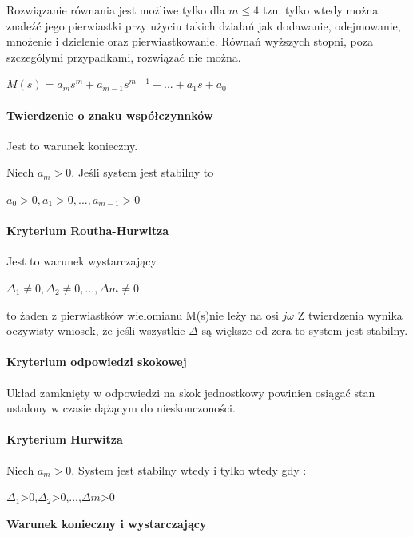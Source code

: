 \documentclass[a4paper,twoside]{report}
\begin{document}
Rozwiązanie równania jest możliwe tylko dla $m\le 4 $ tzn. tylko wtedy można znaleźć jego pierwiastki przy użyciu takich działań jak dodawanie, odejmowanie, mnożenie i dzielenie oraz pierwiastkowanie. Równań wyższych stopni, poza szczególymi przypadkami, rozwiązać nie można.
\begin{center}
$M(s)=a_{m}s^{m}+a_{m-1}s^{m-1}+...+a_{1}s+a_{0} $
\end{center}
\paragraph{Twierdzenie o znaku współczynnków}
Jest to warunek konieczny.

Niech $ a_{m}>0 $. Jeśli system jest stabilny to
\begin{center}
	$ a_{0}>0,a_{1}>0,...,a_{m-1}>0 $
\end{center} 
\paragraph{Kryterium Routha-Hurwitza}
Jest to warunek wystarczający.
\begin{center}
	$\Delta_{1}\neq 0,\Delta_{2}\neq 0,...,\Delta{m}\neq 0 $
\end{center}
to żaden z pierwiastków wielomianu M(s)nie leży na osi $j\omega $
Z twierdzenia wynika oczywisty wniosek, że jeśli wszystkie $ \Delta$ są większe od zera to system jest stabilny.
\paragraph{Kryterium odpowiedzi skokowej}

Układ zamknięty w odpowiedzi na skok jednostkowy powinien osiągać stan ustalony w czasie dążącym do nieskonczoności.

\paragraph{Kryterium Hurwitza}
Niech $ a_{m}>0$. System jest stabilny wtedy i tylko wtedy gdy :
\begin{center}
	$\Delta_{1}$>0,$\Delta_{2}$>0,...,$\Delta{m}$>0
\end{center}
\textbf{Warunek konieczny i wystarczający}
\end{document}

